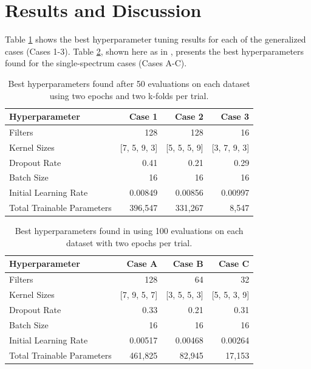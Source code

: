 \documentclass{style/nseJournal}
\begin{document}
\section{Results and Discussion}
\label{sec:results}

Table \ref{tab:hyperparameter_results} shows the best hyperparameter tuning results for each of the generalized cases (Cases 1-3). Table \ref{tab:hyperparameter_results_physor}, shown here as in \cite{PHYSOR}, presents the best hyperparameters found for the single-spectrum cases (Cases A-C).

\begin{table}[!ht]
    \centering
    \small
    \caption{Best hyperparameters found after 50 evaluations on each dataset using two epochs and two k-folds per trial.}
    \begin{tabular}{lrrr}
        \toprule
         \textbf{Hyperparameter}  & \textbf{Case 1} & \textbf{Case 2} & \textbf{Case 3}  \\
         \midrule
         Filters & 128 & 128 & 16\\
         Kernel Sizes & [7, 5, 9, 3] & [5, 5, 5, 9] & [3, 7, 9, 3]\\
         Dropout Rate & 0.41 & 0.21 & 0.29 \\
         Batch Size & 16 & 16 & 16\\
         Initial Learning Rate & 0.00849 & 0.00856 & 0.00997\\
         \midrule
         Total Trainable Parameters & 396,547 & 331,267 & 8,547 \\
         \bottomrule
    \end{tabular}
    \label{tab:hyperparameter_results}
\end{table}

\begin{table}[!ht]
    \centering
    \small
    \caption{Best hyperparameters found in \cite{PHYSOR} using 100 evaluations on each dataset with two epochs per trial.}
    \begin{tabular}{lrrr}
        \toprule
         \textbf{Hyperparameter}  & \textbf{Case A} & \textbf{Case B} & \textbf{Case C}  \\ 
         \midrule
         Filters & 128 & 64& 32\\
         Kernel Sizes & [7, 9, 5, 7] & [3, 5, 5, 3] & [5, 5, 3, 9]\\
         Dropout Rate & 0.33& 0.21 & 0.31 \\
         Batch Size & 16 & 16 & 16\\
         Initial Learning Rate & 0.00517 & 0.00468 & 0.00264\\ 
         \midrule
         Total Trainable Parameters & 461,825 & 82,945 & 17,153 \\
         \bottomrule
    \end{tabular}
    \label{tab:hyperparameter_results_physor}
\end{table}
\end{document}
